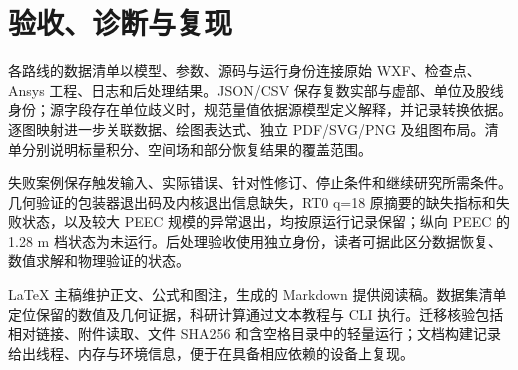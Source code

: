 \section{验收、诊断与复现}
\label{chapter:C}

\hypertarget{C.report_repro.p1}{}
各路线的数据清单以模型、参数、源码与运行身份连接原始 WXF、检查点、Ansys 工程、日志和后处理结果。JSON/CSV 保存复数实部与虚部、单位及股线身份；源字段存在单位歧义时，规范量值依据源模型定义解释，并记录转换依据。逐图映射进一步关联数据、绘图表达式、独立 PDF/SVG/PNG 及组图布局。清单分别说明标量积分、空间场和部分恢复结果的覆盖范围。

\hypertarget{C.report_repro.p2}{}
失败案例保存触发输入、实际错误、针对性修订、停止条件和继续研究所需条件。几何验证的包装器退出码及内核退出信息缺失，RT0 q=18 原摘要的缺失指标和失败状态，以及较大 PEEC 规模的异常退出，均按原运行记录保留；纵向 PEEC 的 1.28 m 档状态为未运行。后处理验收使用独立身份，读者可据此区分数据恢复、数值求解和物理验证的状态。

\hypertarget{C.report_repro.p3}{}
LaTeX 主稿维护正文、公式和图注，生成的 Markdown 提供阅读稿。数据集清单定位保留的数值及几何证据，科研计算通过文本教程与 CLI 执行。迁移核验包括相对链接、附件读取、文件 SHA256 和含空格目录中的轻量运行；文档构建记录给出线程、内存与环境信息，便于在具备相应依赖的设备上复现。

